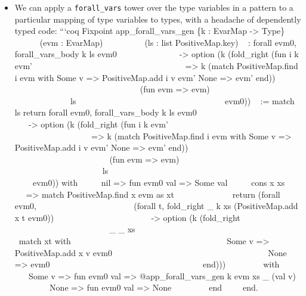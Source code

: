 \begin{itemize}
\begin{itemize}
  \item
    We can apply a \texttt{forall\_vars} tower over the type variables
    in a pattern to a particular mapping of type variables to types,
    with a headache of dependently typed code: ```coq Fixpoint
    app\_forall\_vars\_gen \{k : EvarMap -\textgreater{} Type\} ~ ~ ~ ~
    ~ ~(evm : EvarMap) ~ ~ ~ ~ ~ ~(ls : list PositiveMap.key) ~ : forall
    evm0, forall\_vars\_body k ls evm0 ~ ~ ~ ~ ~ ~ ~ ~ ~-\textgreater{}
    option (k (fold\_right (fun i k evm' ~ ~ ~ ~ ~ ~ ~ ~ ~ ~ ~ ~ ~ ~ ~ ~
    ~ ~ ~ ~ ~ ~=\textgreater{} k (match PositiveMap.find i evm with Some
    v =\textgreater{} PositiveMap.add i v evm' \textbar{} None
    =\textgreater{} evm' end)) ~ ~ ~ ~ ~ ~ ~ ~ ~ ~ ~ ~ ~ ~ ~ ~ ~ ~ ~ ~ ~
    (fun evm =\textgreater{} evm) ~ ~ ~ ~ ~ ~ ~ ~ ~ ~ ~ ~ ~ ~ ~ ~ ~ ~ ~
    ~ ~ ls ~ ~ ~ ~ ~ ~ ~ ~ ~ ~ ~ ~ ~ ~ ~ ~ ~ ~ ~ ~ ~ evm0)) ~ := match
    ls return forall evm0, forall\_vars\_body k ls evm0 ~ ~ ~ ~ ~ ~ ~ ~
    ~ ~ ~ ~ ~ ~ ~ ~ ~ -\textgreater{} option (k (fold\_right (fun i k
    evm' ~ ~ ~ ~ ~ ~ ~ ~ ~ ~ ~ ~ ~ ~ ~ ~ ~ ~ ~ ~ ~ ~ ~ ~ ~ ~ ~ ~ ~ ~
    =\textgreater{} k (match PositiveMap.find i evm with Some v
    =\textgreater{} PositiveMap.add i v evm' \textbar{} None
    =\textgreater{} evm' end)) ~ ~ ~ ~ ~ ~ ~ ~ ~ ~ ~ ~ ~ ~ ~ ~ ~ ~ ~ ~ ~
    ~ ~ ~ ~ ~ ~ ~ ~ ~(fun evm =\textgreater{} evm) ~ ~ ~ ~ ~ ~ ~ ~ ~ ~ ~
    ~ ~ ~ ~ ~ ~ ~ ~ ~ ~ ~ ~ ~ ~ ~ ~ ~ ~ ~ls ~ ~ ~ ~ ~ ~ ~ ~ ~ ~ ~ ~ ~ ~
    ~ ~ ~ ~ ~ ~ ~ ~ ~ ~ ~ ~ ~ ~ ~ ~evm0)) with ~ ~ ~\textbar{} nil
    =\textgreater{} fun evm0 val =\textgreater{} Some val ~ ~
    ~\textbar{} cons x xs ~ ~ ~ ~=\textgreater{} match PositiveMap.find
    x evm as xt ~ ~ ~ ~ ~ ~ ~ ~ return (forall evm0, ~ ~ ~ ~ ~ ~ ~ ~ ~ ~
    ~ ~ ~ ~(forall t, fold\_right \_ k xs (PositiveMap.add x t evm0)) ~
    ~ ~ ~ ~ ~ ~ ~ ~ ~ ~ ~ ~ ~-\textgreater{} option (k (fold\_right ~ ~
    ~ ~ ~ ~ ~ ~ ~ ~ ~ ~ ~ ~ ~ ~ ~ ~ ~ ~ ~ ~\_ \_ xs ~ ~ ~ ~ ~ ~ ~ ~ ~ ~
    ~ ~ ~ ~ ~ ~ ~ ~ ~ ~ ~ ~match xt with ~ ~ ~ ~ ~ ~ ~ ~ ~ ~ ~ ~ ~ ~ ~ ~
    ~ ~ ~ ~ ~ ~\textbar{} Some v =\textgreater{} PositiveMap.add x v
    evm0 ~ ~ ~ ~ ~ ~ ~ ~ ~ ~ ~ ~ ~ ~ ~ ~ ~ ~ ~ ~ ~ ~\textbar{} None
    =\textgreater{} evm0 ~ ~ ~ ~ ~ ~ ~ ~ ~ ~ ~ ~ ~ ~ ~ ~ ~ ~ ~ ~ ~
    ~end))) ~ ~ ~ ~ ~ with ~ ~ ~ ~ ~ \textbar{} Some v =\textgreater{}
    fun evm0 val =\textgreater{} @app\_forall\_vars\_gen k evm xs \_
    (val v) ~ ~ ~ ~ ~ \textbar{} None =\textgreater{} fun evm0 val
    =\textgreater{} None ~ ~ ~ ~ ~ end ~ ~ ~end.
  \end{itemize}


\end{itemize}
